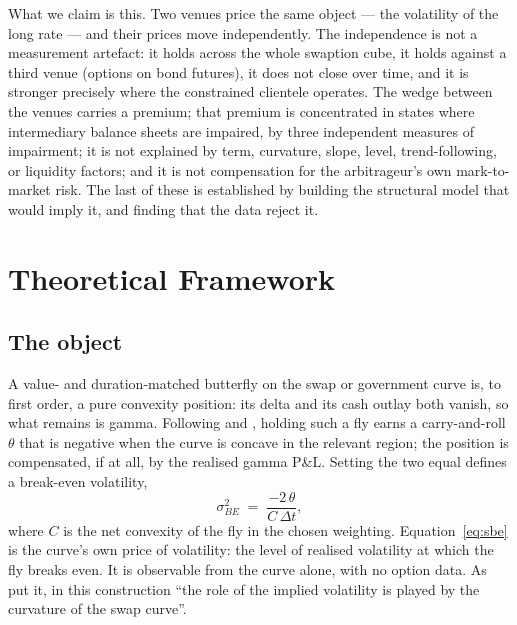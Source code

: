 \documentclass[11pt]{article}
\newcommand{\sBE}{\sigma_{BE}}
\begin{document}
What we claim is this. Two venues price the same object --- the volatility of the long rate --- and
their prices move independently. The independence is not a measurement artefact: it holds across the
whole swaption cube, it holds against a third venue (options on bond futures), it does not close over
time, and it is stronger precisely where the constrained clientele operates. The wedge between the
venues carries a premium; that premium is concentrated in states where intermediary balance sheets are
impaired, by three independent measures of impairment; it is not explained by term, curvature, slope,
level, trend-following, or liquidity factors; and it is not compensation for the arbitrageur's own
mark-to-market risk. The last of these is established by building the structural model that would
imply it, and finding that the data reject it.

\section{Theoretical Framework}\label{sec:theory}

\subsection{The object}
A value- and duration-matched butterfly on the swap or government curve is, to first order, a pure
convexity position: its delta and its cash outlay both vanish, so what remains is gamma. Following
\citet{rp2018} and \citet{rr2021}, holding such a fly earns a carry-and-roll $\theta$ that is negative
when the curve is concave in the relevant region; the position is compensated, if at all, by the
realised gamma P\&L. Setting the two equal defines a break-even volatility,
\begin{equation}
\sBE^2 \;=\; \frac{-2\,\theta}{C\,\Delta t},
\label{eq:sbe}
\end{equation}
where $C$ is the net convexity of the fly in the chosen weighting. Equation~\eqref{eq:sbe} is the
curve's own price of volatility: the level of realised volatility at which the fly breaks even. It is
observable from the curve alone, with no option data. As \citet{rr2021} put it, in this construction
``the role of the implied volatility is played by the curvature of the swap curve''.
\end{document}
